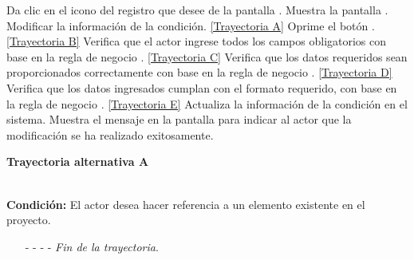 \begin{UCtrayectoria}
	\UCpaso[\UCactor] Da clic en el icono \editar del registro que desee de la pantalla .
	\UCpaso[\UCsist] Muestra la pantalla .
	\UCpaso[\UCactor] Modificar la información de la condición. \hyperlink{CU12-1-2-2:TAA}{[Trayectoria A]} \label{CU12.1.2.2-P3}
	\UCpaso[\UCactor] Oprime el botón . \hyperlink{CU12-1-2-2:TAB}{[Trayectoria B]} \label{CU12.1.2.2-P4}
	\UCpaso[\UCsist] Verifica que el actor ingrese todos los campos obligatorios con base en la regla de negocio . \hyperlink{CU12-1-2-2:TAC}{[Trayectoria C]}
	\UCpaso[\UCsist] Verifica que los datos requeridos sean proporcionados correctamente con base en la regla de negocio . \hyperlink{CU12-1-2-2:TAD}{[Trayectoria D]}
	\UCpaso[\UCsist] Verifica que los datos ingresados cumplan con el formato requerido, con base en la regla de negocio . \hyperlink{CU12-1-2-2:TAE}{[Trayectoria E]}
	\UCpaso[\UCsist] Actualiza la información de la condición en el sistema.
	\UCpaso[\UCsist] Muestra el mensaje  en la pantalla  para indicar al actor que la modificación se ha realizado exitosamente.
\end{UCtrayectoria}		
\hypertarget{CU12-1-2-2:TAA}{\textbf{Trayectoria alternativa A}}\\
\noindent \textbf{Condición:} El actor desea hacer referencia a un elemento existente en el proyecto.
\begin{enumerate}
	\UCpaso[\UCactor] Ingresa el token correspondiente al elemento a referenciar.
	\UCpaso[\UCsist] Verifica que los tokens utilizados se encuentren correctamente estructurados, con base en la regla de negocio . 
	\UCpaso[\UCsist] Obtiene los \hyperlink{tElemento}{elementos} registrados en el proyecto correspondientes al token ingresado. 
	\UCpaso[\UCsist] Muestra una lista con los \hyperlink{tElemento}{elementos} encontrados.
	\UCpaso[\UCactor] Selecciona un elemento de la lista.
	\UCpaso[\UCsist] Verifica que el nombre del elemento seleccionado no contenga espacios. \hyperlink{CU12-1-2-2:TAF}{[Trayectoria F]}
	\UCpaso[\UCsist] Agrega la referencia del elemento al texto. \label{CU12.1.2.2-TA1}
	\UCpaso Continúa en el paso \ref{CU12.1.2.2-P4} de la trayectoria principal.
	\item[- -] - - {\em {Fin de la trayectoria}}.%
\end{enumerate}
